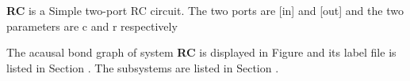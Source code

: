

\textbf{RC} is a Simple two-port RC circuit.  The two ports are [in]
and [out] and the two parameters are c and r respectively

   The acausal bond graph of system \textbf{RC} is
   displayed in Figure  and its label
   file is listed in Section .
   The subsystems are listed in Section .
